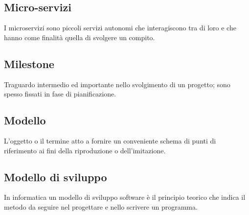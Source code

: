 \subsection*{Micro-servizi}
I microservizi sono piccoli servizi autonomi che interagiscono tra di loro e che hanno come finalità quella di svolgere un compito.

\subsection*{Milestone}
Traguardo intermedio ed importante nello svolgimento di un progetto; sono spesso fissati in fase di pianificazione.

\subsection*{Modello}
L'oggetto o il termine atto a fornire un conveniente schema di punti di riferimento ai fini della riproduzione o dell'imitazione.

\subsection*{Modello di sviluppo}
In informatica un modello di sviluppo software è il principio teorico che indica il metodo da seguire nel progettare e nello scrivere un programma.

